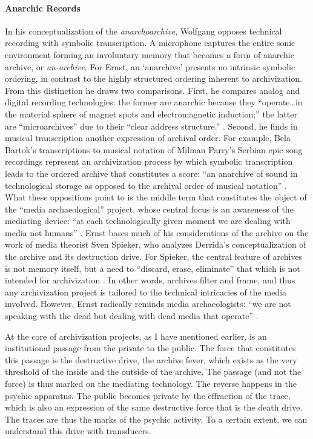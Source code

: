 
\paragraph{Anarchic Records}
In his conceptualization of the \textit{anarchoarchive}, Wolfgang \textcite{Ern13:Dig} opposes technical recording with symbolic transcription. A microphone captures the entire sonic environment forming an involuntary memory that becomes a form of anarchic archive, or \textit{an-archive}. For Ernst, an `anarchive' presents no intrinsic symbolic ordering, in contrast to the highly structured ordering inherent to archivization. From this distinction he draws two comparisons. First, he compares analog and digital recording technologies: the former are anarchic because they ``operate\dots in the material sphere of magnet spots and electromagnetic induction;'' the latter are ``microarchives'' due to their ``clear address structure.'' \textcite[92]{Ern13:Dig}. Second, he finds in musical transcription another expression of archival order. For example, Bela Bartok's transcriptions to musical notation of Milman Parry's Serbian epic song recordings represent an archivization process by which symbolic transcription leads to the ordered archive that constitutes a score: ``an anarchive of sound in technological storage as opposed to the archival order of musical notation'' \parencite[174]{Ern13:Dig}. What these oppositions point to is the middle term that constitutes the object of the ``media archaeological'' project, whose central focus is an awareness of the mediating device: ``at each technologically given moment we are dealing with media not humans'' \parencite[183]{Ern13:Dig}. Ernst bases much of his considerations of the archive on the work of media theorist Sven Spieker, who analyzes Derrida's conceptualization of the archive and its destruction drive. For Spieker, the central feature of archives is not memory itself, but a need to ``discard, erase, eliminate'' that which is not intended for archivization \parencite[113]{Ern13:Dig}. In other words, archives filter and frame, and thus any archivization project is tailored to the technical intricacies of the media involved. However, Ernst radically reminds media archaeologists: ``we are not speaking with the dead but dealing with dead media that operate'' \parencite[183]{Ern13:Dig}.   

At the core of archivization projects, as I have mentioned earlier, is an institutional passage from the private to the public. The force that constitutes this passage is the destructive drive, the archive fever, which exists as the very threshold of the inside and the outside of the archive. The passage (and not the force) is thus marked on the mediating technology. The reverse happens in the psychic apparatus. The public becomes private by the effraction of the trace, which is also an expression of the same destructive force that is the death drive. The traces are thus the marks of the psychic activity. To a certain extent, we can understand this drive with transducers.

